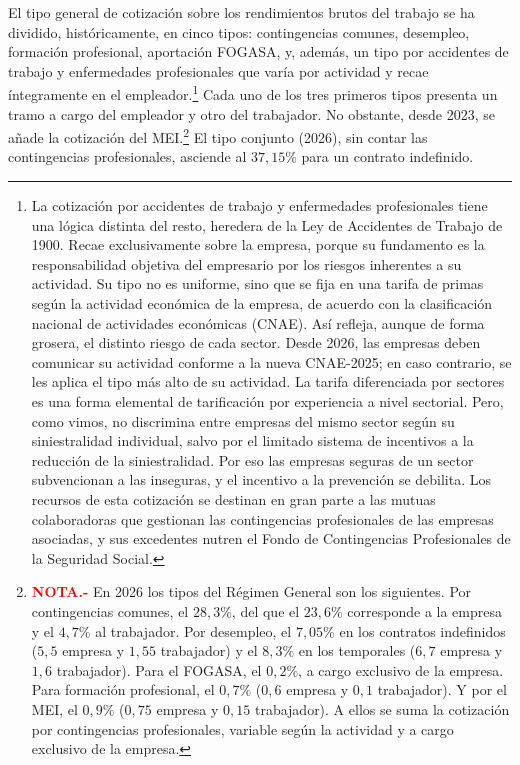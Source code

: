 \documentclass[10pt,a4paper]{article}
\begin{document}
El tipo general de cotización sobre los rendimientos brutos del trabajo se ha dividido, históricamente, en cinco tipos: contingencias comunes, desempleo, formación profesional, aportación FOGASA, y, además, un tipo por accidentes de trabajo y enfermedades profesionales que varía por actividad y recae íntegramente en el empleador.\footnote{%
    La cotización por accidentes de trabajo y enfermedades profesionales tiene una lógica distinta del resto, heredera de la Ley de Accidentes de Trabajo de 1900. Recae exclusivamente sobre la empresa, porque su fundamento es la responsabilidad objetiva del empresario por los riesgos inherentes a su actividad. Su tipo no es uniforme, sino que se fija en una tarifa de primas según la actividad económica de la empresa, de acuerdo con la clasificación nacional de actividades económicas (CNAE). Así refleja, aunque de forma grosera, el distinto riesgo de cada sector. Desde 2026, las empresas deben comunicar su actividad conforme a la nueva CNAE-2025; en caso contrario, se les aplica el tipo más alto de su actividad. La tarifa diferenciada por sectores es una forma elemental de tarificación por experiencia a nivel sectorial. Pero, como vimos, no discrimina entre empresas del mismo sector según su siniestralidad individual, salvo por el limitado sistema de incentivos a la reducción de la siniestralidad. Por eso las empresas seguras de un sector subvencionan a las inseguras, y el incentivo a la prevención se debilita. Los recursos de esta cotización se destinan en gran parte a las mutuas colaboradoras que gestionan las contingencias profesionales de las empresas asociadas, y sus excedentes nutren el Fondo de Contingencias Profesionales de la Seguridad Social.
} Cada uno de los tres primeros tipos presenta un tramo a cargo del empleador y otro del trabajador. No obstante, desde 2023, se añade la cotización del MEI.\footnote{%
    \textcolor{red}{\textbf{NOTA.-}} En 2026 los tipos del Régimen General son los siguientes. Por contingencias comunes, el $28,3\%$, del que el $23,6\%$ corresponde a la empresa y el $4,7\%$ al trabajador. Por desempleo, el $7,05\%$ en los contratos indefinidos ($5,5$ empresa y $1,55$ trabajador) y el $8,3\%$ en los temporales ($6,7$ empresa y $1,6$ trabajador). Para el FOGASA, el $0,2\%$, a cargo exclusivo de la empresa. Para formación profesional, el $0,7\%$ ($0,6$ empresa y $0,1$ trabajador). Y por el MEI, el $0,9\%$ ($0,75$ empresa y $0,15$ trabajador). A ellos se suma la cotización por contingencias profesionales, variable según la actividad y a cargo exclusivo de la empresa.
} El tipo conjunto (2026), sin contar las contingencias profesionales, asciende al $37,15\%$ para un contrato indefinido.
\end{document}
